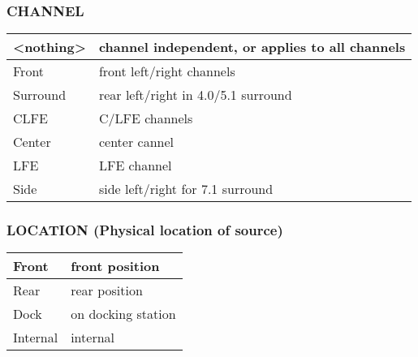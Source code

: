 \documentclass[a4paper,8pt,english]{sphinxmanual}
\begin{document}
\subsubsection{CHANNEL}
\label{sound/designs/control-names:channel}
\begin{tabulary}{\linewidth}{|L|L|}
\hline

\textless{}nothing\textgreater{}
 & 
channel independent, or applies to all channels
\\
\hline
Front
 & 
front left/right channels
\\
\hline
Surround
 & 
rear left/right in 4.0/5.1 surround
\\
\hline
CLFE
 & 
C/LFE channels
\\
\hline
Center
 & 
center cannel
\\
\hline
LFE
 & 
LFE channel
\\
\hline
Side
 & 
side left/right for 7.1 surround
\\
\hline\end{tabulary}



\subsubsection{LOCATION (Physical location of source)}
\label{sound/designs/control-names:location-physical-location-of-source}
\begin{tabulary}{\linewidth}{|L|L|}
\hline

Front
 & 
front position
\\
\hline
Rear
 & 
rear position
\\
\hline
Dock
 & 
on docking station
\\
\hline
Internal
 & 
internal
\\
\hline\end{tabulary}
\end{document}

